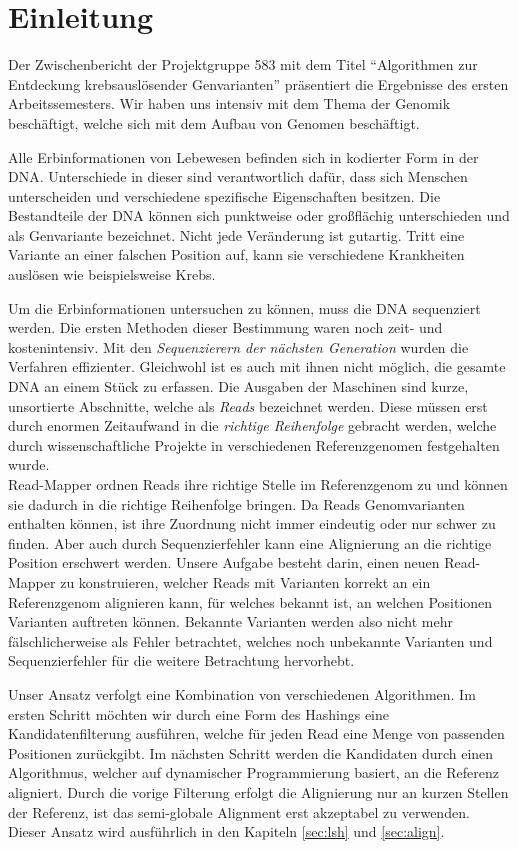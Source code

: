 \chapter{Einleitung}
\label{sec:einleitung}

Der Zwischenbericht der Projektgruppe 583 mit dem Titel "`Algorithmen zur Entdeckung krebsauslösender Genvarianten"' präsentiert die Ergebnisse des ersten Arbeitssemesters. Wir haben uns intensiv mit dem Thema der Genomik beschäftigt, welche sich mit dem Aufbau von Genomen beschäftigt.

Alle Erbinformationen von Lebewesen befinden sich in kodierter Form in der DNA. Unterschiede in dieser sind verantwortlich dafür, dass sich Menschen unterscheiden und verschiedene spezifische Eigenschaften besitzen. Die Bestandteile der DNA können sich punktweise oder großflächig unterschieden und als Genvariante bezeichnet. Nicht jede Veränderung ist gutartig. Tritt eine Variante an einer falschen Position auf, kann sie verschiedene Krankheiten auslösen wie beispielsweise Krebs. 

Um die Erbinformationen untersuchen zu können, muss die DNA sequenziert werden. Die ersten Methoden dieser Bestimmung waren noch zeit- und kostenintensiv. Mit den \textit{Sequenzierern der nächsten Generation} wurden die Verfahren effizienter. Gleichwohl ist es auch mit ihnen nicht möglich, die gesamte DNA an einem Stück zu erfassen. Die Ausgaben der Maschinen sind kurze, unsortierte Abschnitte, welche als \textit{Reads} bezeichnet werden. Diese müssen erst durch enormen Zeitaufwand in die \textit{richtige Reihenfolge} gebracht werden, welche durch wissenschaftliche Projekte in verschiedenen Referenzgenomen festgehalten wurde.\\
Read-Mapper ordnen Reads ihre richtige Stelle im Referenzgenom zu und können sie dadurch in die richtige Reihenfolge bringen. Da Reads Genomvarianten enthalten können, ist ihre Zuordnung nicht immer eindeutig oder nur schwer zu finden. Aber auch durch Sequenzierfehler kann eine Alignierung an die richtige Position erschwert werden. Unsere Aufgabe besteht darin, einen neuen Read-Mapper zu konstruieren, welcher Reads mit Varianten korrekt an ein Referenzgenom alignieren kann, für welches bekannt ist, an welchen Positionen Varianten auftreten können. Bekannte Varianten werden also nicht mehr fälschlicherweise als Fehler betrachtet, welches noch unbekannte Varianten und Sequenzierfehler für die weitere Betrachtung hervorhebt.

Unser Ansatz verfolgt eine Kombination von verschiedenen Algorithmen. Im ersten Schritt möchten wir durch eine Form des Hashings eine Kandidatenfilterung ausführen, welche für jeden Read eine Menge von passenden Positionen zurückgibt. Im nächsten Schritt werden die Kandidaten durch einen Algorithmus, welcher auf dynamischer Programmierung basiert, an die Referenz aligniert. Durch die vorige Filterung erfolgt die Alignierung nur an kurzen Stellen der Referenz, ist das semi-globale Alignment erst akzeptabel zu verwenden. Dieser Ansatz wird ausführlich in den Kapiteln \ref{sec:lsh} und \ref{sec:align}.

